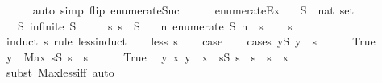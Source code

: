 \begin{isabellebody}
\ \ \ \ \isamarkupfalse%
\ {\isacharparenleft}auto\ simp\ flip{\isacharcolon}\ enumerate{\isacharunderscore}Suc{\isacharprime}{\isacharparenright}\isanewline
\ \ \ \ \isamarkupfalse%
\isanewline
{}\isamarkupfalse%
%
\endisatagproof
{\isafoldproof}%
%
\isadelimproof
\isanewline
%
\endisadelimproof
\isanewline
{}\isamarkupfalse%
\ enumerate{\isacharunderscore}Ex{\isacharcolon}\isanewline
\ \ \ S\ {\isacharcolon}{\isacharcolon}\ {\isachardoublequoteopen}nat\ set{\isachardoublequoteclose}\isanewline
\ \ \ S{\isacharcolon}\ {\isachardoublequoteopen}infinite\ S{\isachardoublequoteclose}\isanewline
\ \ \ \ \ s{\isacharcolon}\ {\isachardoublequoteopen}s\ {\isasymin}\ S{\isachardoublequoteclose}\isanewline
\ \ \ {\isachardoublequoteopen}{\isasymexists}n{\isachardot}\ enumerate\ S\ n\ {\isacharequal}\ s{\isachardoublequoteclose}\isanewline
%
\isadelimproof
\ \ %
\endisadelimproof
%
\isatagproof
{}\isamarkupfalse%
\ s\isanewline
{}\isamarkupfalse%
\ {\isacharparenleft}induct\ s\ rule{\isacharcolon}\ less{\isacharunderscore}induct{\isacharparenright}\isanewline
\ \ \isamarkupfalse%
\ {\isacharparenleft}less\ s{\isacharparenright}\isanewline
\ \ \isamarkupfalse%
\ {\isacharquery}case\isanewline
\ \ \isamarkupfalse%
\ {\isacharparenleft}cases\ {\isachardoublequoteopen}{\isasymexists}y{\isasymin}S{\isachardot}\ y\ {\isacharless}\ s{\isachardoublequoteclose}{\isacharparenright}\isanewline
\ \ \ \ \isamarkupfalse%
\ True\isanewline
\ \ \ \ \isamarkupfalse%
\ {\isacharquery}y\ {\isacharequal}\ {\isachardoublequoteopen}Max\ {\isacharbraceleft}s{\isacharprime}{\isasymin}S{\isachardot}\ s{\isacharprime}\ {\isacharless}\ s{\isacharbraceright}{\isachardoublequoteclose}\isanewline
\ \ \ \ \isamarkupfalse%
\ True\ \isamarkupfalse%
\ y{\isacharcolon}\ {\isachardoublequoteopen}{\isasymAnd}x{\isachardot}\ {\isacharquery}y\ {\isacharless}\ x\ {\isasymlongleftrightarrow}\ {\isacharparenleft}{\isasymforall}s{\isacharprime}{\isasymin}S{\isachardot}\ s{\isacharprime}\ {\isacharless}\ s\ {\isasymlongrightarrow}\ s{\isacharprime}\ {\isacharless}\ x{\isacharparenright}{\isachardoublequoteclose}\isanewline
\ \ \ \ \ \ \isamarkupfalse%
\ {\isacharparenleft}subst\ Max{\isacharunderscore}less{\isacharunderscore}iff{\isacharparenright}\ auto\isanewline
\ \ \ \ \isamarkupfalse%
\ \isamarkupfalse%

\end{isabellebody}
